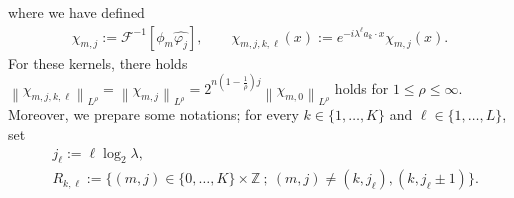 \documentclass[a4paper,12pt,reqno]{amsart}
\theoremstyle{plain}
\theoremstyle{definition}
\renewcommand{\leq}{\leqslant}
\newcommand{\n}[1]{{\left\|#1\right\|}}
\newcommand{\Z}{\mathbb{Z}}
\begin{document}
where we have defined 
\begin{align}
    \chi_{m,j}:=\mathscr{F}^{-1}[\phi_m\widehat{\varphi_j}],
    \qquad
    \chi_{m,j,k,\ell}(x):=e^{-i\lambda^\ell a_k\cdot x}\chi_{m,j}(x).
\end{align}
For these kernels, there holds
$\n{\chi_{m,j,k,\ell}}_{L^\rho}=\n{\chi_{m,j}}_{L^{\rho}}=2^{n(1-\frac{1}{\rho})j}\n{\chi_{m,0}}_{L^\rho}$ holds for $1 \leq \rho \leq \infty$.
Moreover, we prepare some notations;
for every $k \in\{1,\dots,K\}$ and $\ell \in \{1,\dots,L\}$,
set 
\begin{align}
    &
    j_{\ell}:=\ell\log_2\lambda,
    \\
    &
    R_{k,\ell}
    :=
    \{(m,j) \in \{0,\dots,K\} \times \Z\ ;\ (m,j)\neq(k,j_{\ell}),(k,j_{\ell}\pm 1)\}.
\end{align}
\end{document}
